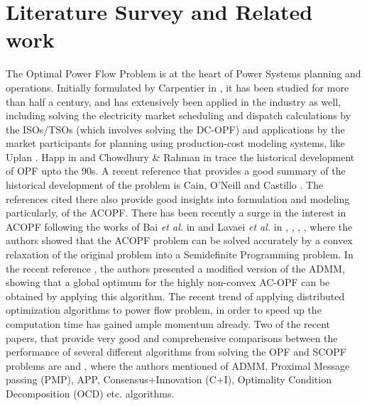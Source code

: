 \documentclass[preprint,12pt,3p]{elsarticle}
\begin{document}
\section{Literature Survey and Related work}
\label{literature}
\noindent The Optimal Power Flow Problem is at the heart of Power Systems planning and operations. Initially formulated by Carpentier in \cite{Carp:62}, it has been studied for more than half a century, and has extensively been applied in the industry as well, including solving the electricity market scheduling and dispatch calculations by the ISOs/TSOs (which involves solving the DC-OPF) and applications by the market participants for planning using production-cost modeling systems, like Uplan \cite{Sambuddha2010}. Happ in \cite{Happ:77} and Chowdhury \& Rahman in \cite{CR:90} trace the historical development of OPF upto the 90s. A recent reference that provides a good summary of the historical development of the problem is Cain, O'Neill and Castillo \cite{cain2012history}. The references cited there also provide good insights into formulation and modeling particularly, of the ACOPF. There has been recently a surge in the interest in ACOPF following the works of Bai \emph{et al.} in \cite{BWW:08} and Lavaei \emph{et al.} in \cite{LL:12}, \cite{SL:12a}, \cite{SL:12b}, \cite{LTZ:12}, where the authors showed that the ACOPF problem can be solved accurately by a convex relaxation of the original problem into a Semidefinite Programming problem. In the recent reference \cite{MHANNA201891}, the authors presented a modified version of the ADMM, showing that a global optimum for the highly non-convex AC-OPF can be obtained by applying this algorithm. The recent trend of applying distributed optimization algorithms to power flow problem, in order to speed up the computation time has gained ample momentum already. Two of the recent papers, that provide very good and comprehensive comparisons between the performance of several different algorithms from solving the OPF and SCOPF problems are \cite{SurvMol} and \cite{SurvKarg}, where the authors mentioned of ADMM, Proximal Message passing (PMP), APP, Consensus+Innovation (C+I), Optimality Condition Decomposition (OCD) etc. algorithms.
\end{document}
